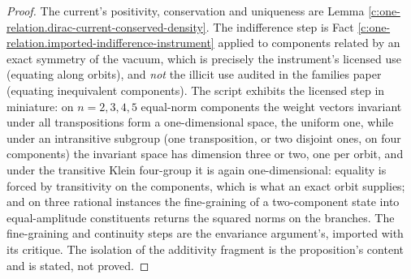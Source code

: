 \documentclass[11pt]{article}
\theoremstyle{definition}
\theoremstyle{plain}
\begin{document}
\begin{proof}
The current's positivity, conservation and uniqueness are Lemma \ref{c:one-relation.dirac-current-conserved-density}. The indifference step is Fact \ref{c:one-relation.imported-indifference-instrument} applied to components related by an exact symmetry of the vacuum, which is precisely the instrument's licensed use (equating along orbits), and \emph{not} the illicit use audited in the families paper (equating inequivalent components). The script exhibits the licensed step in miniature: on $n = 2, 3, 4, 5$ equal-norm components the weight vectors invariant under all transpositions form a one-dimensional space, the uniform one, while under an intransitive subgroup (one transposition, or two disjoint ones, on four components) the invariant space has dimension three or two, one per orbit, and under the transitive Klein four-group it is again one-dimensional: equality is forced by transitivity on the components, which is what an exact orbit supplies; and on three rational instances the fine-graining of a two-component state into equal-amplitude constituents returns the squared norms on the branches. The fine-graining and continuity steps are the envariance argument's, imported with its critique. The isolation of the additivity fragment is the proposition's content and is stated, not proved.

\end{proof}
\end{document}
